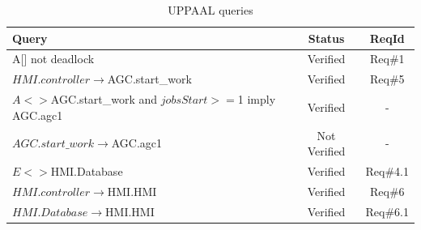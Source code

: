 \begin{table}[h]
\centering
\begin{tabular}{|p{4.5cm}|c|c|}
\hline
Query & Status & ReqId \\ \hline
A[] not deadlock & Verified & Req\#1 \\ \hline
$HMI.controller \rightarrow $AGC.start\_work & Verified &  Req\#5 \\ \hline
$A<> $AGC.start\_work and $jobsStart>=$1 imply AGC.agc1 & Verified & - \\ \hline
$AGC.start\_work \rightarrow $AGC.agc1   & Not Verified  & - \\ \hline
$E<> $HMI.Database  & Verified & Req\#4.1 \\ \hline
$HMI.controller \rightarrow $HMI.HMI & Verified  &Req\#6 \\ \hline
$HMI.Database \rightarrow $HMI.HMI & Verified & Req\#6.1 \\ \hline
\end{tabular}
\caption{UPPAAL queries}
\label{tab:uppaal_queries}
\end{table}

